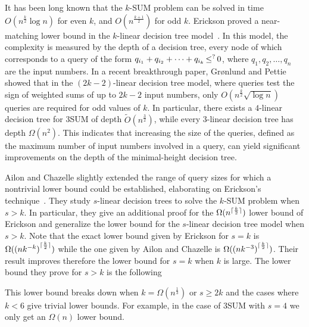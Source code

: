 It has been long known that the \(k\)-SUM problem can be solved in time
$O(n^{\frac{k}{2}}\log n)$ for even $k$, and $O(n^{\frac{k+1}{2}})$ for odd
$k$. Erickson proved a near-matching lower bound in the $k$-linear
decision tree model~\cite{Er99a}. In this model, the complexity is measured by the depth of
a decision tree, every node of which corresponds to a query of the form
$q_{i_1} + q_{i_2} + \cdots + q_{i_k} \mathop{\le}^{?} 0$, where $q_1, q_2, \ldots, q_n$ are the
input numbers. In a recent breakthrough paper, Gr\o nlund and
Pettie~\cite{GP18} showed that in the $(2k-2)$-linear decision tree model,
where queries test the sign of weighted sums of up to $2k-2$ input numbers, only
$O(n^\frac{k}{2}\sqrt{\log n})$ queries are required for odd values of $k$. In
particular, there exists a $4$-linear decision tree for 3SUM of depth
$\tilde{O}(n^\frac{3}{2})$, while every 3-linear decision tree has depth $\Omega
(n^2)$. This indicates that increasing the size of the queries,
defined as the maximum number of input numbers involved in a query, can yield
significant improvements on the depth of the minimal-height decision tree.

Ailon and Chazelle slightly extended the range of query sizes for which a
nontrivial lower bound could be established, elaborating on Erickson's
technique~\cite{AC05}.
%
They study \(s\)-linear decision trees to solve the \(k\)-SUM problem when
\(s > k\). In particular, they give an additional proof for the
$\Omega(n^{\lceil\frac{k}{2}\rceil})$ lower bound of Erickson and
generalize the lower bound for the \(s\)-linear decision tree model when \(s >
k\). Note that the exact lower bound given by Erickson for \(s = k\) is
$\Omega({(nk^{-k})}^{\lceil\frac{k}{2}\rceil})$ while the one given by
Ailon and Chazelle is $\Omega({(nk^{-3})}^{\lceil\frac{k}{2}\rceil})$. Their result
improves therefore the lower bound for \(s = k\) when \(k\) is large.
The lower bound they prove for \(s > k\) is the following
%

%
This lower bound breaks down when
\(k = \Omega(n^{\frac{1}{3}})\) or \(s \ge 2 k\) and the cases where \(k < 6\)
give trivial lower bounds. For example, in the case
of 3SUM with \(s = 4\) we only get an $\Omega(n)$ lower bound.

